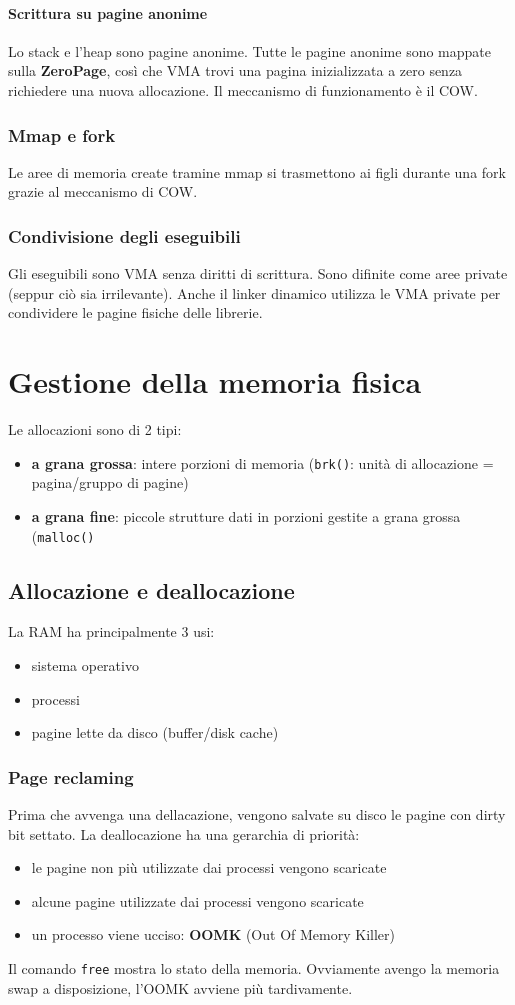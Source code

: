 \documentclass[12pt, a4paper]{report}
\begin{document}
\subsubsection{Scrittura su pagine anonime}
Lo stack e l'heap sono pagine anonime. Tutte le pagine anonime sono mappate
sulla \textbf{ZeroPage}, così che VMA trovi una pagina inizializzata a zero
senza richiedere una nuova allocazione. Il meccanismo di funzionamento è il COW.

\subsection{Mmap e fork}
Le aree di memoria create tramine mmap si trasmettono ai figli durante una fork
grazie al meccanismo di COW.

\subsection{Condivisione degli eseguibili}
Gli eseguibili sono VMA senza diritti di scrittura. Sono difinite come aree
private (seppur ciò sia irrilevante). Anche il linker dinamico utilizza le VMA
private per condividere le pagine fisiche delle librerie.

\chapter{Gestione della memoria fisica}
Le allocazioni sono di 2 tipi:
\begin{itemize}
	\item \textbf{a grana grossa}: intere porzioni di memoria (\texttt{brk()}:
		unità di allocazione = pagina/gruppo di pagine)
	\item \textbf{a grana fine}: piccole strutture dati in porzioni gestite a
		grana grossa (\texttt{malloc()}
\end{itemize}
\section{Allocazione e deallocazione}
La RAM ha principalmente 3 usi:
\begin{itemize}
	\item sistema operativo
	\item processi
	\item pagine lette da disco (buffer/disk cache)
\end{itemize}
\subsection{Page reclaming}
Prima che avvenga una dellacazione, vengono salvate su disco le pagine con dirty
bit settato.
La deallocazione ha una gerarchia di priorità:
\begin{itemize}
	\item le pagine non più utilizzate dai processi vengono scaricate
	\item alcune pagine utilizzate dai processi vengono scaricate
	\item un processo viene ucciso: \textbf{OOMK} (Out Of Memory Killer)
\end{itemize}
Il comando \texttt{free} mostra lo stato della memoria.
Ovviamente avengo la memoria swap a disposizione, l'OOMK avviene più
tardivamente.
\end{document}
